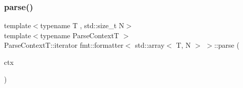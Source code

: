 \mbox{\label{structfmt_1_1formatter_3_01std_1_1array_3_01_t_00_01_n_01_4_01_4_a282357230d9bb58bfff722acd404f1c2}} 
\subsubsection{\texorpdfstring{parse()}{parse()}}
{\footnotesize\ttfamily template$<$typename T , std\+::size\+\_\+t N$>$ \\
template$<$typename Parse\+ContextT $>$ \\
Parse\+Context\+T\+::iterator fmt\+::formatter$<$ std\+::array$<$ T, N $>$ $>$\+::parse (\begin{DoxyParamCaption}\item[{Parse\+ContextT \&}]{ctx }\end{DoxyParamCaption})}

